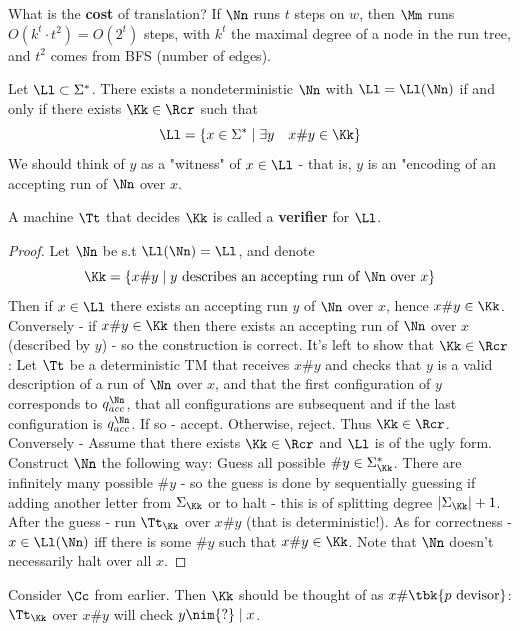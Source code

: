 What is the \textbf{cost} of translation? If $\Nn$ runs $t$ steps on $w$, then $\Mm$ runs $O(k^t\cdot t^2) = O(2^t)$ steps, with $k^t$ the maximal degree of a node in the run tree, and $t^2$ comes from BFS (number of edges).
\begin{blueBox}
	\begin{thm}
		Let $\Ll\subset \Sigma^*$. There exists a nondeterministic $\Nn$ with $\Ll = \Ll(\Nn)$ if and only if there exists $\Kk\in \Rcr$ such that \[
		\Ll = \{x\in \Sigma^*\mid \exists y\quad x\#y\in \Kk \}
		\]
		We should think of $y$ as a "witness" of $x\in \Ll$ - that is, $y$ is an "encoding of an accepting run of $\Nn$ over $x$.
	\end{thm}
\begin{remark}
	A machine $\Tt$ that decides $\Kk$ is called a \textbf{verifier} for $\Ll$.
\end{remark}
\end{blueBox}
\begin{proof}
	Let $\Nn$ be s.t $\Ll(\Nn) = \Ll$, and denote
	\[
	\Kk = \{x\#y\mid y\text{ describes an accepting run of $\Nn$ over $x$}\}
	\] Then if $x\in \Ll$ there exists an accepting run $y$ of $\Nn$ over $x$, hence $x\# y\in \Kk$. Conversely - if $x\#y\in \Kk$ then there exists an accepting run of $\Nn$ over $x$ (described by $y$) - so the construction is correct. It's left to show that $\Kk\in \Rcr$:
	Let $\Tt$ be a deterministic TM that receives $x\# y$ and checks that $y$ is a valid description of a run of $\Nn$ over $x$, and that the first configuration of $y$ corresponds to $q_{acc}^\Nn$, that all configurations are subsequent and if the last configuration is $q_{acc}^\Nn$. If so - accept. Otherwise, reject. Thus $\Kk\in \Rcr$.\\
	
	Conversely - Assume that there exists $\Kk\in \Rcr$ and $\Ll$ is of the ugly form. Construct $\Nn$ the following way: Guess all possible $\#y\in\Sigma^*_\Kk$. There are infinitely many possible $\# y$ - so the guess is done by sequentially guessing if adding another letter from $\Sigma_\Kk$ or to halt - this is of splitting degree $|\Sigma_\Kk| +1 $. After the guess - run $\Tt_\Kk$ over $x\# y$ (that is deterministic!). As for correctness - $x\in \Ll(\Nn)$ iff there is some $\# y$ such that $x \# y\in \Kk$. Note that $\Nn$ doesn't necessarily halt over all $x$.
\end{proof}

\begin{example}
	Consider $\Cc$ from earlier. Then $\Kk$ should be thought of as $x\# \tbk{p \text{ devisor}}$: $\Tt_\Kk$ over $x\#y$ will check $y\nim{?}\mid x$.
\end{example}

